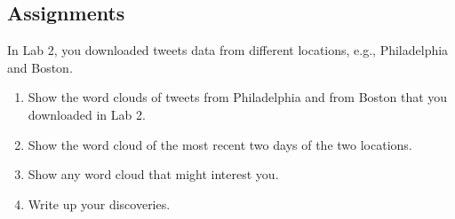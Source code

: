 \documentclass[a4paper, 11pt]{article}
\begin{document}
\subsection{Assignments}
In Lab 2, you downloaded tweets data from different locations, e.g., Philadelphia and Boston.
\begin{enumerate}
\item Show the word clouds of tweets from Philadelphia and from Boston that you downloaded in Lab 2.
\item Show the word cloud of the most recent two days of the two locations. 
\item Show any word cloud that might interest you.
\item Write up your discoveries.
\end{enumerate}
%
\end{document}
